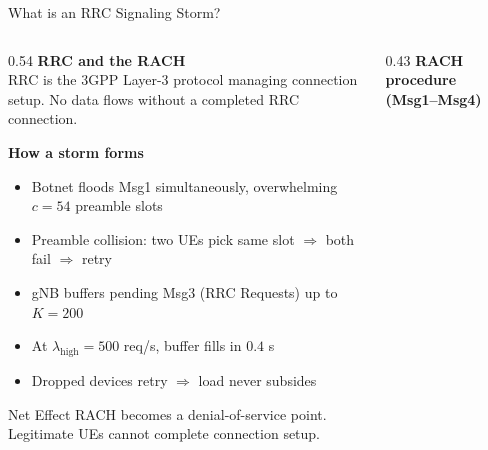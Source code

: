 \documentclass[aspectratio=169,t]{beamer}
\begin{document}
\begin{frame}{What is an RRC Signaling Storm?}

  \begin{columns}[T]
    \begin{column}{0.54\textwidth}
      \footnotesize
      \textbf{RRC and the RACH}\\[1pt]
      RRC is the 3GPP Layer-3 protocol managing connection setup.
      No data flows without a completed RRC connection.

      \vspace{2pt}
      \textbf{How a storm forms}
      \begin{itemize}\setlength\itemsep{0pt}
        \item Botnet floods Msg1 simultaneously, overwhelming $c=54$ preamble slots
        \item Preamble collision: two UEs pick same slot $\Rightarrow$ both fail $\Rightarrow$ retry
        \item gNB buffers pending Msg3 (RRC Requests) up to $K=200$
        \item At $\lambda_{\mathrm{high}}=500$ req/s, buffer fills in $0.4$ s
        \item Dropped devices retry $\Rightarrow$ load never subsides
      \end{itemize}

      \vspace{2pt}
      \begin{alertblock}{\footnotesize Net Effect}
        \footnotesize\vspace{-2pt}
        RACH becomes a denial-of-service point.
        Legitimate UEs cannot complete connection setup.
      \end{alertblock}
    \end{column}

    \begin{column}{0.43\textwidth}
      \textbf{RACH procedure (Msg1--Msg4)}

      \vspace{6pt}
      \begin{center}
\end{center}
\end{column}
\end{columns}
\end{frame}
\end{document}
